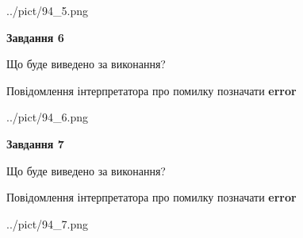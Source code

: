 \documentclass[10pt, ukrainian]{article}
\begin{document}
{\begin {large}
\begin{center}
	{../pict/94_5.png}
\end{center}
\newpage

{\begin {center}\textbf{Завдання 6}\end {center}}\par
Що буде виведено за виконання? \par
Повідомлення інтерпретатора про помилку позначати \textbf{error}

\begin{center}
	{../pict/94_6.png}
\end{center}
\newpage

{\begin {center}\textbf{Завдання 7}\end {center}}\par
Що буде виведено за виконання? \par
Повідомлення інтерпретатора про помилку позначати \textbf{error}

\begin{center}
	{../pict/94_7.png}
\end{center}
\newpage

\end {large}}
\end{document}
